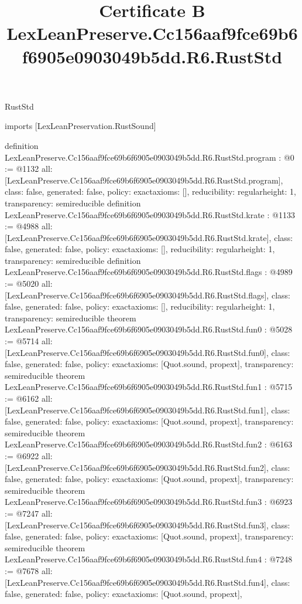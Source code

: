 \begin{lexlean}{RustStd}
\title{Certificate B LexLeanPreserve.Cc156aaf9fce69b6f6905e0903049b5dd.R6.RustStd}
\begin{coremodule}
imports [LexLeanPreservation.RustSound]

definition LexLeanPreserve.Cc156aaf9fce69b6f6905e0903049b5dd.R6.RustStd.program : @0 := @1132 {
  all: [LexLeanPreserve.Cc156aaf9fce69b6f6905e0903049b5dd.R6.RustStd.program],
  class: false,
  generated: false,
  policy: exact{axioms: []},
  reducibility: regular{height: 1},
  transparency: semireducible
}
definition LexLeanPreserve.Cc156aaf9fce69b6f6905e0903049b5dd.R6.RustStd.krate : @1133 := @4988 {
  all: [LexLeanPreserve.Cc156aaf9fce69b6f6905e0903049b5dd.R6.RustStd.krate],
  class: false,
  generated: false,
  policy: exact{axioms: []},
  reducibility: regular{height: 1},
  transparency: semireducible
}
definition LexLeanPreserve.Cc156aaf9fce69b6f6905e0903049b5dd.R6.RustStd.flags : @4989 := @5020 {
  all: [LexLeanPreserve.Cc156aaf9fce69b6f6905e0903049b5dd.R6.RustStd.flags],
  class: false,
  generated: false,
  policy: exact{axioms: []},
  reducibility: regular{height: 1},
  transparency: semireducible
}
theorem LexLeanPreserve.Cc156aaf9fce69b6f6905e0903049b5dd.R6.RustStd.fun0 : @5028 := @5714 {
  all: [LexLeanPreserve.Cc156aaf9fce69b6f6905e0903049b5dd.R6.RustStd.fun0],
  class: false,
  generated: false,
  policy: exact{axioms: [Quot.sound, propext]},
  transparency: semireducible
}
theorem LexLeanPreserve.Cc156aaf9fce69b6f6905e0903049b5dd.R6.RustStd.fun1 : @5715 := @6162 {
  all: [LexLeanPreserve.Cc156aaf9fce69b6f6905e0903049b5dd.R6.RustStd.fun1],
  class: false,
  generated: false,
  policy: exact{axioms: [Quot.sound, propext]},
  transparency: semireducible
}
theorem LexLeanPreserve.Cc156aaf9fce69b6f6905e0903049b5dd.R6.RustStd.fun2 : @6163 := @6922 {
  all: [LexLeanPreserve.Cc156aaf9fce69b6f6905e0903049b5dd.R6.RustStd.fun2],
  class: false,
  generated: false,
  policy: exact{axioms: [Quot.sound, propext]},
  transparency: semireducible
}
theorem LexLeanPreserve.Cc156aaf9fce69b6f6905e0903049b5dd.R6.RustStd.fun3 : @6923 := @7247 {
  all: [LexLeanPreserve.Cc156aaf9fce69b6f6905e0903049b5dd.R6.RustStd.fun3],
  class: false,
  generated: false,
  policy: exact{axioms: [Quot.sound, propext]},
  transparency: semireducible
}
theorem LexLeanPreserve.Cc156aaf9fce69b6f6905e0903049b5dd.R6.RustStd.fun4 : @7248 := @7678 {
  all: [LexLeanPreserve.Cc156aaf9fce69b6f6905e0903049b5dd.R6.RustStd.fun4],
  class: false,
  generated: false,
  policy: exact{axioms: [Quot.sound, propext]},
}
\end{coremodule}
\end{lexlean}
